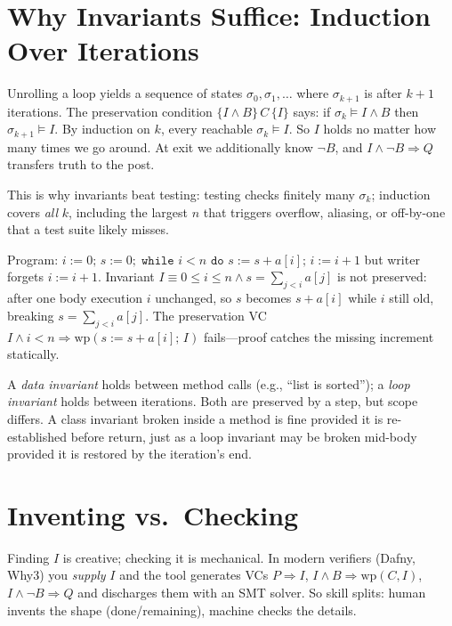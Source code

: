 \section{Why Invariants Suffice: Induction Over Iterations}
\label{sec:induction}
Unrolling a loop yields a sequence of states $\sigma_0,\sigma_1,\dots$ where $\sigma_{k+1}$ is after $k+1$ iterations. The preservation condition $\{I\land B\}\,C\,\{I\}$ says: if $\sigma_k\models I\land B$ then $\sigma_{k+1}\models I$. By induction on $k$, every reachable $\sigma_k\models I$. So $I$ holds no matter how many times we go around. At exit we additionally know $\neg B$, and $I\land\neg B\Rightarrow Q$ transfers truth to the post.

This is why invariants beat testing: testing checks finitely many $\sigma_k$; induction covers \emph{all} $k$, including the largest $n$ that triggers overflow, aliasing, or off-by-one that a test suite likely misses.

\begin{example}
Program: $i:=0;\,s:=0;\;\texttt{while }i<n\texttt{ do }s:=s+a[i];\,i:=i+1$ but writer forgets $i:=i+1$. Invariant $I\equiv 0\le i\le n\land s=\sum_{j<i}a[j]$ is not preserved: after one body execution $i$ unchanged, so $s$ becomes $s+a[i]$ while $i$ still old, breaking $s=\sum_{j<i}a[j]$. The preservation VC $I\land i<n\Rightarrow \text{wp}(s:=s+a[i];\,I)$ fails—proof catches the missing increment statically.
\end{example}

\begin{remark}
A \emph{data invariant} holds between method calls (e.g., ``list is sorted''); a \emph{loop invariant} holds between iterations. Both are preserved by a step, but scope differs. A class invariant broken inside a method is fine provided it is re-established before return, just as a loop invariant may be broken mid-body provided it is restored by the iteration's end.
\end{remark}

\section{Inventing vs.\ Checking}
\label{sec:invent-check}
Finding $I$ is creative; checking it is mechanical. In modern verifiers (Dafny, Why3) you \emph{supply} $I$ and the tool generates VCs $P\Rightarrow I$, $I\land B\Rightarrow \text{wp}(C,I)$, $I\land\neg B\Rightarrow Q$ and discharges them with an SMT solver. So skill splits: human invents the shape (done/remaining), machine checks the details.

